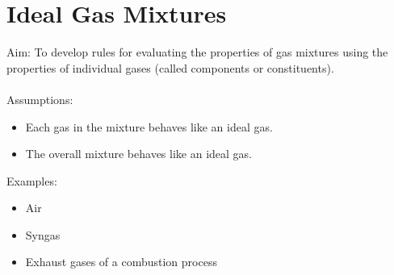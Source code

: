 \documentclass[class=report, crop=false, 12pt,a4paper]{standalone}
\begin{document}
\section{Ideal Gas Mixtures}
Aim: To develop rules for evaluating the properties of gas mixtures using the properties of individual gases (called components or constituents). \\\\
Assumptions:
\begin{itemize}[noitemsep]
  \item Each gas in the mixture behaves like an ideal gas.
  \item The overall mixture behaves like an ideal gas.
\end{itemize}
Examples:
\begin{itemize}[noitemsep]
  \item Air
  \item Syngas
  \item Exhaust gases of a combustion process
\end{itemize}
\end{document}
